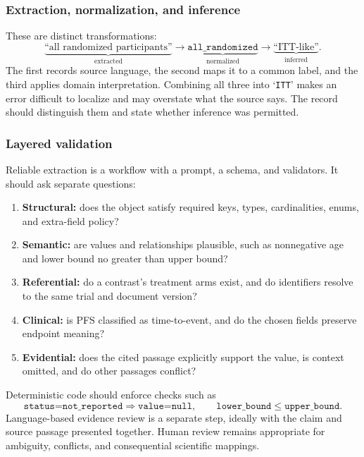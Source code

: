\documentclass[12pt,oneside]{book}
\numberwithin{equation}{section}
\theoremstyle{definition}
\theoremstyle{plain}
\theoremstyle{remark}
\begin{document}
\subsubsection{Extraction, normalization, and inference}

These are distinct transformations:
\[
 \underbrace{\text{``all randomized participants''}}_{\text{extracted}}
 \longrightarrow
 \underbrace{\texttt{all\_randomized}}_{\text{normalized}}
 \longrightarrow
 \underbrace{\text{``ITT-like''}}_{\text{inferred}}.
\]
The first records source language, the second maps it to a common label, and the
third applies domain interpretation.  Combining all three into `\texttt{ITT}'
makes an error difficult to localize and may overstate what the source says.
The record should distinguish them and state whether inference was permitted.

\subsubsection{Layered validation}

Reliable extraction is a workflow with a prompt, a schema, and validators.  It
should ask separate questions:
\begin{enumerate}
    \item \textbf{Structural:} does the object satisfy required keys, types,
    cardinalities, enums, and extra-field policy?
    \item \textbf{Semantic:} are values and relationships plausible, such as
    nonnegative age and lower bound no greater than upper bound?
    \item \textbf{Referential:} do a contrast's treatment arms exist, and do
    identifiers resolve to the same trial and document version?
    \item \textbf{Clinical:} is PFS classified as time-to-event, and do the
    chosen fields preserve endpoint meaning?
    \item \textbf{Evidential:} does the cited passage explicitly support the
    value, is context omitted, and do other passages conflict?
\end{enumerate}
Deterministic code should enforce checks such as
\[
 \texttt{status=not\_reported}\Rightarrow\texttt{value=null},
 \qquad
 \texttt{lower\_bound}\leq\texttt{upper\_bound}.
\]
Language-based evidence review is a separate step, ideally with the claim and
source passage presented together.  Human review remains appropriate for
ambiguity, conflicts, and consequential scientific mappings.
\end{document}

